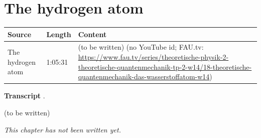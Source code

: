 \chapter{The hydrogen atom}\label{ch:c18}
\begin{paracol}{2}

\begin{sources}
\begin{tabularx}{\linewidth}{@{}l l L@{}}
\toprule
\textbf{Source} & \textbf{Length} & \textbf{Content}\\
\midrule
The hydrogen atom & 1:05:31 & (to be written) (no YouTube id; FAU.tv: \url{https://www.fau.tv/series/theoretische-physik-2-theoretische-quantenmechanik-tp-2-w14/18-theoretische-quantenmechanik-das-wasserstoffatom-w14})\\
\bottomrule
\end{tabularx}

\smallskip
\textbf{Transcript} .
\end{sources}

\begin{reading}
(to be written)
\end{reading}

\emph{This chapter has not been written yet.}

\flushside
\end{paracol}
